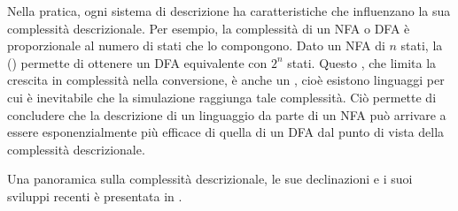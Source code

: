 Nella pratica, ogni sistema di descrizione ha caratteristiche che influenzano la sua complessità descrizionale. Per esempio, la complessità di un NFA o DFA è proporzionale al numero di stati che lo compongono. Dato un NFA di $n$ stati, la  (\cite{Rabin:59:NFA}) permette di ottenere un DFA equivalente con $2^n$ stati. Questo , che limita la crescita in complessità nella conversione, è anche un , cioè esistono linguaggi per cui è inevitabile che la simulazione raggiunga tale complessità. Ciò permette di concludere che la descrizione di un linguaggio da parte di un NFA può arrivare a essere esponenzialmente più efficace di quella di un DFA dal punto di vista della complessità descrizionale.

Una panoramica sulla complessità descrizionale, le sue declinazioni e i suoi sviluppi recenti è presentata in \cite{Kutrib:21:descriptional}.
